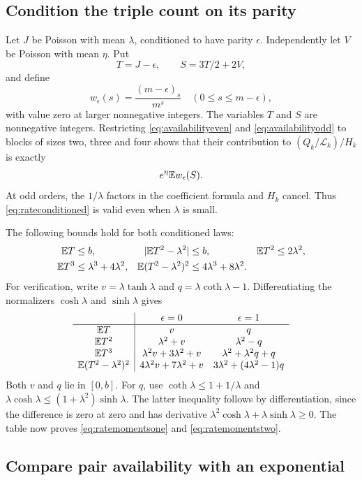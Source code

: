 \subsection{Condition the triple count on its parity}

Let $J$ be Poisson with mean $\lambda$, conditioned to have parity $\epsilon$. Independently let $V$ be Poisson with mean $\eta$. Put
\[
T=J-\epsilon,\qquad S=3T/2+2V,
\]
and define
\[
w_\epsilon(s)=\frac{(m-\epsilon)_s}{m^s}
\quad(0\le s\le m-\epsilon),
\]
with value zero at larger nonnegative integers. The variables $T$ and $S$ are nonnegative integers. Restricting \eqref{eq:availabilityeven} and \eqref{eq:availabilityodd} to blocks of sizes two, three and four shows that their contribution to $(Q_k/\mathcal L_k)/H_k$ is exactly
\begin{equation}\label{eq:rateconditioned}
e^\eta\mathbb E w_\epsilon(S).
\end{equation}
At odd orders, the $1/\lambda$ factors in the coefficient formula and $H_k$ cancel. Thus \eqref{eq:rateconditioned} is valid even when $\lambda$ is small.

The following bounds hold for both conditioned laws:
\begin{align}
\mathbb E T&\le b,&
|\mathbb E T^2-\lambda^2|&\le b,&
\mathbb E T^2&\le2\lambda^2,\label{eq:ratemomentsone}\\
\mathbb E T^3&\le\lambda^3+4\lambda^2,&
\mathbb E(T^2-\lambda^2)^2&\le4\lambda^3+8\lambda^2.
&&\label{eq:ratemomentstwo}
\end{align}
For verification, write $v=\lambda\tanh\lambda$ and $q=\lambda\coth\lambda-1$. Differentiating the normalizers $\cosh\lambda$ and $\sinh\lambda$ gives
\[
\begin{array}{c|cc}
&\epsilon=0&\epsilon=1\\ \hline
\mathbb E T&v&q\\
\mathbb E T^2&\lambda^2+v&\lambda^2-q\\
\mathbb E T^3&\lambda^2v+3\lambda^2+v&\lambda^2+\lambda^2q+q\\
\mathbb E(T^2-\lambda^2)^2&4\lambda^2v+7\lambda^2+v&3\lambda^2+(4\lambda^2-1)q
\end{array}
\]
Both $v$ and $q$ lie in $[0,b]$. For $q$, use $\coth\lambda\le1+1/\lambda$ and
$\lambda\cosh\lambda\le(1+\lambda^2)\sinh\lambda$. The latter inequality follows by differentiation, since the difference is zero at zero and has derivative $\lambda^2\cosh\lambda+\lambda\sinh\lambda\ge0$. The table now proves \eqref{eq:ratemomentsone} and \eqref{eq:ratemomentstwo}.

\subsection{Compare pair availability with an exponential}

